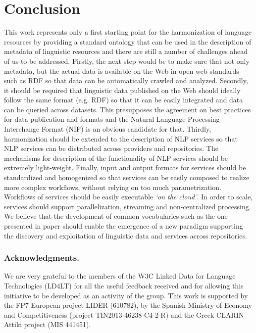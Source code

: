 \documentclass{llncs}
\begin{document}
\section{Conclusion}
\label{sec:conclusion}
This work represents only a first starting point for the harmonization of
language resources by providing a standard ontology that can be used in the
description of metadata of linguistic resources
and there are still a number of challenges
ahead of us to be addressed. Firstly, the next step would be to make sure that
not only metadata, but the actual data is available on the Web in open web
standards such as RDF so that data can be automatically crawled and analyzed.
Secondly, it should be required that linguistic data published on the
Web should ideally follow the same format (e.g. RDF) so that it can be
easily integrated and data can be queried across datasets. This presupposes
the agreement on best practices for data publication and formats and the
Natural Language Processing Interchange Format
(NIF)\cite{hellmann2013integrating} is an obvious candidate for that. Thirdly,
harmonization should be extended to the description of NLP services so that NLP
services can be distributed across providers and repositories. The mechanisms for
description of the functionality of NLP services should be extremely
light-weight. Finally, input and output formats for services should be
standardized and homogenized so that services can be easily composed to realize
more complex workflows, without relying on too much parametrization. Workflows
of services should be easily executable \emph{`on the cloud'}. In order to
scale, services should support parallelization, streaming and 
non-centralized processing. %
We believe that the development of common vocabularies
such as the one presented in paper should enable the emergence of a new paradigm supporting the discovery and exploitation of linguistic data and services across repositories.


\subsubsection*{Acknowledgments.} We are very grateful to the members of the W3C Linked Data for Language Technologies (LD4LT) for all the useful feedback received and for allowing this initiative to be developed as an activity of the group. This work is supported by the FP7 European project LIDER (610782), by the Spanish Ministry of Economy and Competitiveness (project TIN2013-46238-C4-2-R) and the Greek CLARIN Attiki project (MIS 441451).


\end{document}
